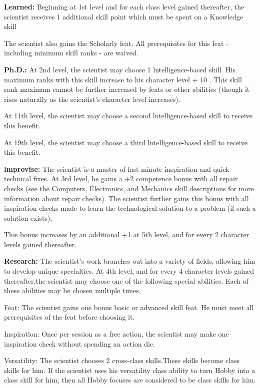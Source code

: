 \vspace*{5pt}

\textbf{Learned:} Beginning at 1st level and for each class level gained thereafter, the scientist receives 1 additional skill point which must be spent on a Knowledge skill

The scientist also gains the Scholarly feat. All prerequisites for this feat - including minimum skill ranks - are waived.

\textbf{Ph.D.:} At 2nd level, the scientist may choose 1 lntelligence-based skill. His maximum ranks with this skill increase to his character level + 10 . This skill rank maximum cannot be further increased by feats or other abilities (though it rises naturally as the scientist's character level increases).

At 11th level, the scientist may choose a second lntelligence-based skill to receive this benefit.

At 19th level, the scientist may choose a third lntelligence-based skill to receive this benefit.

\textbf{lmprovise:} The scientist is a master of last minute inspiration and quick technical fixes. At 3rd level, he gains a +2 competence bonus with all repair checks (see the Computers, Electronics, and Mechanics skill descriptions for more information about repair checks). The scientist further gains this bonus with all inspiration checks made to learn the technological solution to a problem (if such a solution exists).

This bonus increases by an additional +1 at 5th level, and for every 2 character levels gained thereafter.

\textbf{Research:} The scientist's work branches out into a variety of fields, allowing him to develop unique specialties. At 4th level, and for every 4 character levels gained thereafter,the scientist may choose one of the following special abilities. Each of these abilities may be chosen multiple times.

\begin{description*}
\item[\hspace{1.5cm}Feat:] The scientist gains one bonus basic or advanced skill feat. He must meet all prerequisites of the feat before choosing it.
\item[\hspace{1.5cm}Inspiration:] Once per session as a free action, the scientist may make one inspiration check without spending an action die.
\item[\hspace{1.5cm}Versatility:] The scientist chooses 2 cross-class skills.These skills become class skills for him. If the scientist uses his versatility class ability to turn Hobby into a class skill for him, then all Hobby focuses are considered to be class skills for him.
\end{description*}

